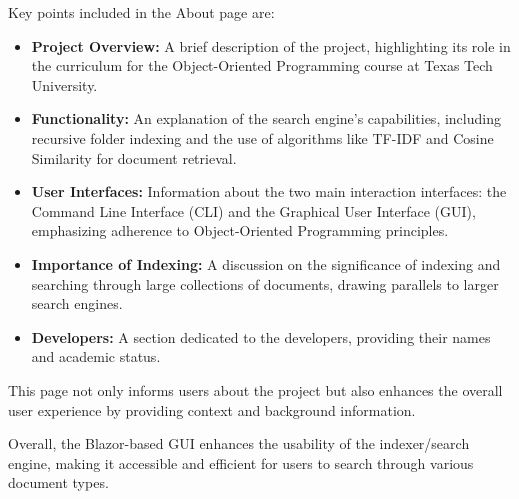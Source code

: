 \documentclass{article}
\begin{document}
Key points included in the About page are:
\begin{itemize}
    \item \textbf{Project Overview:} A brief description of the project, highlighting its role in the curriculum for the Object-Oriented Programming course at Texas Tech University.
    \item \textbf{Functionality:} An explanation of the search engine's capabilities, including recursive folder indexing and the use of algorithms like TF-IDF and Cosine Similarity for document retrieval.
    \item \textbf{User Interfaces:} Information about the two main interaction interfaces: the Command Line Interface (CLI) and the Graphical User Interface (GUI), emphasizing adherence to Object-Oriented Programming principles.
    \item \textbf{Importance of Indexing:} A discussion on the significance of indexing and searching through large collections of documents, drawing parallels to larger search engines.
    \item \textbf{Developers:} A section dedicated to the developers, providing their names and academic status.
\end{itemize}

This page not only informs users about the project but also enhances the overall user experience by providing context and background information.

Overall, the Blazor-based GUI enhances the usability of the indexer/search engine, making it accessible and efficient for users to search through various document types.
\end{document}
